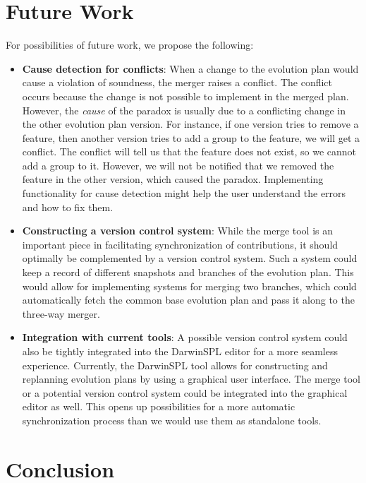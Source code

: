 \documentclass[a4paper,english]{ifimaster}
\begin{document}
\section{Future Work}%
\label{sec:future_work}

For possibilities of future work, we propose the following:

\begin{itemize}
  \item \textbf{Cause detection for conflicts}: When a change to the evolution plan would cause a violation of soundness, the merger raises a conflict. The conflict occurs because the change is not possible to implement in the merged plan. However, the \textit{cause} of the paradox is usually due to a conflicting change in the other evolution plan version. For instance, if one version tries to remove a feature, then another version tries to add a group to the feature, we will get a conflict. The conflict will tell us that the feature does not exist, so we cannot add a group to it. However, we will not be notified that we removed the feature in the other version, which caused the paradox. Implementing functionality for cause detection might help the user understand the errors and how to fix them.
  \item \textbf{Constructing a version control system}: While the merge tool is an important piece in facilitating synchronization of contributions, it should optimally be complemented by a version control system. Such a system could keep a record of different snapshots and branches of the evolution plan. This would allow for implementing systems for merging two branches, which could automatically fetch the common base evolution plan and pass it along to the three-way merger.
  \item \textbf{Integration with current tools}: A possible version control system could also be tightly integrated into the DarwinSPL editor for a more seamless experience. Currently, the DarwinSPL tool allows for constructing and replanning evolution plans by using a graphical user interface. The merge tool or a potential version control system could be integrated into the graphical editor as well. This opens up possibilities for a more automatic synchronization process than we would use them as standalone tools.
\end{itemize}

\section{Conclusion}%
\label{sec:conclusion}
\end{document}
